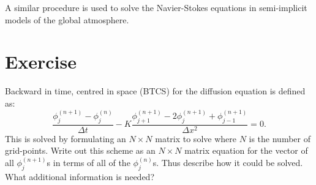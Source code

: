 A similar procedure is used to solve the Navier-Stokes equations in semi-implicit models of the global atmosphere. 

\section{Exercise}

Backward in time, centred in space (BTCS) for the diffusion equation is defined as:
\begin{equation}
\frac{\phi^{(n+1)}_j - \phi^{(n)}_j}{\Delta t} -K\frac{\phi^{(n+1)}_{j+1} - 2\phi^{(n+1)}_{j} + \phi^{(n+1)}_{j-1}}{\Delta x^2} = 0.
\end{equation}
This is solved by formulating an $N\times N$ matrix to solve where $N$ is the number of grid-points. Write out this scheme as an $N\times N$ matrix equation for the vector of all $\phi_j^{(n+1)}$s in terms of all of the $\phi_j^{(n)}$s. Thus describe how it could be solved. What additional information is needed?

